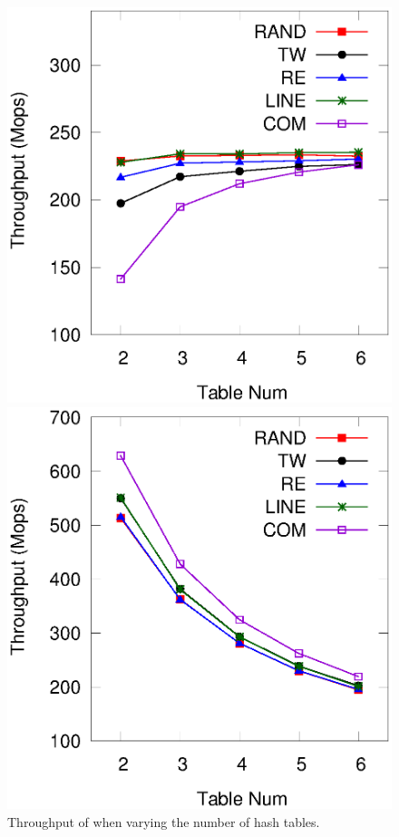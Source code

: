 \begin{figure}[t!]
	\begin{minipage}{0.48\linewidth}\centering
		\includegraphics[width=\linewidth]{pic/tunning/tunning-insert.eps}
		\centerline{}
	\end{minipage}
	\hfill
	\begin{minipage}{0.48\linewidth}\centering
		\includegraphics[width=\linewidth]{pic/tunning/tunning-search.eps}
		\centerline{}
	\end{minipage}
	\caption{Throughput of \voter when varying the number of hash tables.}
	\label{fig:vary-table}
\end{figure}



